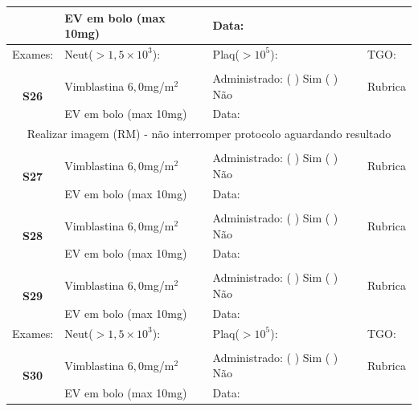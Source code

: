 \documentclass[11pt,a4paper,oldfontcommands]{memoir}
\begin{document}
\begin{center}
\begin{table}[H]
\begin{tabular}{p{}p{}|p{}|p{3cm}}
    \multicolumn{1}{c|}{}&{EV em bolo (max 10mg)}&{Data:}&\\
    \hline
    {Exames:}&{Neut(\(>1,5\times10^3\)):}&{Plaq(\(>10^5\)):}&{TGO:}
    \\
    \hline\\
    \hline
    \multicolumn{1}{c|}{\multirow{2}{*}{\textbf{S26}}}&{Vimblastina \(6,0\)mg/m\(^2\)}&{Administrado: (  ) Sim (  ) Não}&{Rubrica}\\
    \multicolumn{1}{c|}{}&{EV em bolo (max 10mg)}&{Data:}&\\
    \hline
    \multicolumn{4}{c}{Realizar imagem (RM) - não interromper protocolo aguardando resultado}
    \\
    \hline\\
    \hline
    \multicolumn{1}{c|}{\multirow{2}{*}{\textbf{S27}}}&{Vimblastina \(6,0\)mg/m\(^2\)}&{Administrado: (  ) Sim (  ) Não}&{Rubrica}\\
    \multicolumn{1}{c|}{}&{EV em bolo (max 10mg)}&{Data:}&\\
    \hline
    \\
    \hline
    \multicolumn{1}{c|}{\multirow{2}{*}{\textbf{S28}}}&{Vimblastina \(6,0\)mg/m\(^2\)}&{Administrado: (  ) Sim (  ) Não}&{Rubrica}\\
    \multicolumn{1}{c|}{}&{EV em bolo (max 10mg)}&{Data:}&\\
    \hline
    \\
    \hline
    \multicolumn{1}{c|}{\multirow{2}{*}{\textbf{S29}}}&{Vimblastina \(6,0\)mg/m\(^2\)}&{Administrado: (  ) Sim (  ) Não}&{Rubrica}\\
    \multicolumn{1}{c|}{}&{EV em bolo (max 10mg)}&{Data:}&\\
    \hline
    {Exames:}&{Neut(\(>1,5\times10^3\)):}&{Plaq(\(>10^5\)):}&{TGO:}
    \\
    \hline
    \\
    \hline
    \multicolumn{1}{c|}{\multirow{2}{*}{\textbf{S30}}}&{Vimblastina \(6,0\)mg/m\(^2\)}&{Administrado: (  ) Sim (  ) Não}&{Rubrica}\\
    \multicolumn{1}{c|}{}&{EV em bolo (max 10mg)}&{Data:}&\\
    \hline
\end{tabular}
\end{table}
\begin{table}[H]
\begin{tabular}{p{}p{}|p{}|p{3cm}}


\end{tabular}
\end{table}
\end{center}
\end{document}
